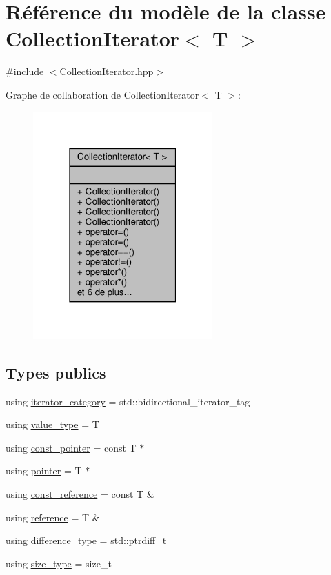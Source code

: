 \hypertarget{class_collection_iterator}{}\section{Référence du modèle de la classe Collection\+Iterator$<$ T $>$}
\label{class_collection_iterator}


{\ttfamily \#include $<$Collection\+Iterator.\+hpp$>$}



Graphe de collaboration de Collection\+Iterator$<$ T $>$\+:\nopagebreak
\begin{figure}[H]
\begin{center}
\leavevmode
\includegraphics[width=195pt]{class_collection_iterator__coll__graph}
\end{center}
\end{figure}
\subsection*{Types publics}
\begin{DoxyCompactItemize}
\item 
using \hyperlink{class_collection_iterator_a0f4af23418960a0fe3889b5381d6a79c}{iterator\+\_\+category} = std\+::bidirectional\+\_\+iterator\+\_\+tag
\item 
using \hyperlink{class_collection_iterator_a8513f3c29655e48f34f8b6a11b96a71b}{value\+\_\+type} = T
\item 
using \hyperlink{class_collection_iterator_a9bff5744ce1cfc8f704fa52557699594}{const\+\_\+pointer} = const T $\ast$
\item 
using \hyperlink{class_collection_iterator_aff846a9c86022d66a7eb10e3623a0ba0}{pointer} = T $\ast$
\item 
using \hyperlink{class_collection_iterator_ab0f0742da5375882a74038d82de41aca}{const\+\_\+reference} = const T \&
\item 
using \hyperlink{class_collection_iterator_aac15417aa7a67fdfb86b8bad1b4d5ddf}{reference} = T \&
\item 
using \hyperlink{class_collection_iterator_a4dca8639d1f342073ccf8bcd4d27e3bf}{difference\+\_\+type} = std\+::ptrdiff\+\_\+t
\item 
using \hyperlink{class_collection_iterator_a1302f39e9a4763886e48a045e53c00cf}{size\+\_\+type} = size\+\_\+t
\end{DoxyCompactItemize}
